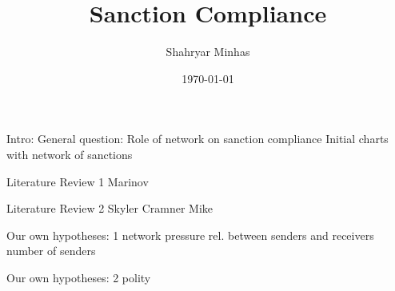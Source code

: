 \documentclass{beamer}
\title[When Do States Say Uncle? \hspace{14em} \insertframenumber/
\inserttotalframenumber]{Sanction Compliance}
\author{Shahryar Minhas}
\institute[Duke University]
{
{\emph{sfm12@duke.edu}} \\
\medskip
Duke University 
}
\date{\today}
\begin{document}
\begin{frame}
\titlepage
\end{frame}

Intro:
	General question: 
		Role of network on sanction compliance
	Initial charts with network of sanctions

Literature Review 1
	Marinov

Literature Review 2
	Skyler Cramner
	Mike

Our own hypotheses: 1
	network pressure
		rel. between senders and receivers
		number of senders

Our own hypotheses: 2
	polity
\end{document}
